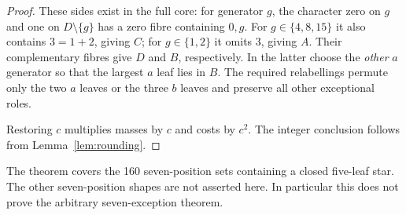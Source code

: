 \begin{proof}
These sides exist in the full core: for generator $g$, the character
zero on $g$ and one on $D\setminus\{g\}$ has a zero fibre containing
$0,g$. For $g\in\{4,8,15\}$ it also contains $3=1+2$, giving $C$;
for $g\in\{1,2\}$ it omits $3$, giving $A$. Their complementary
fibres give $D$ and $B$, respectively. In the latter choose the
\emph{other} $a$ generator so that the largest $a$ leaf lies in $B$.
The required relabellings permute only the two $a$ leaves or the three
$b$ leaves and preserve all other exceptional roles.

Restoring $c$ multiplies masses by $c$ and costs by $c^2$.
The integer conclusion follows from Lemma~\ref{lem:rounding}.
\end{proof}

The theorem covers the 160 seven-position sets containing a closed
five-leaf star. The other seven-position shapes are not asserted here.
In particular this does not prove the arbitrary seven-exception theorem.
